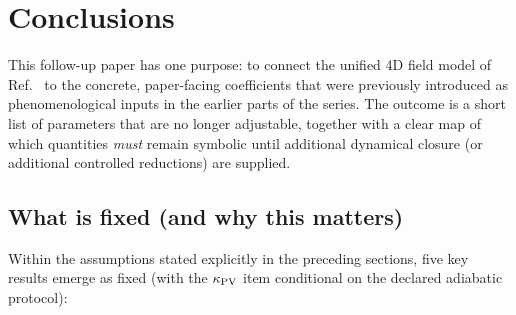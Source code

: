 \documentclass[11pt]{article}
\begin{document}
\section{Conclusions}
\label{sec:conclusions}

This follow-up paper has one purpose: to connect the unified 4D field model of Ref.~\cite{norris2026_4d_model} to the concrete, paper-facing coefficients that were previously introduced as phenomenological inputs in the earlier parts of the series. The outcome is a short list of parameters that are no longer adjustable, together with a clear map of which quantities \emph{must} remain symbolic until additional dynamical closure (or additional controlled reductions) are supplied.

\subsection*{What is fixed (and why this matters)}
Within the assumptions stated explicitly in the preceding sections, five key results emerge as fixed (with the \(\kappa_{\rm PV}\) item conditional on the declared adiabatic protocol):
\end{document}
